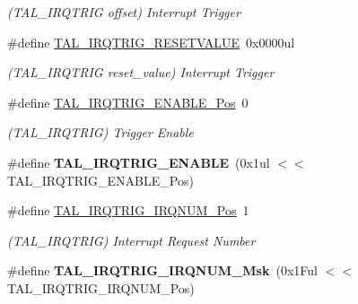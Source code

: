 \begin{DoxyCompactItemize}
\begin{DoxyCompactList}\small\item\em (T\+A\+L\+\_\+\+I\+R\+Q\+T\+R\+I\+G offset) Interrupt Trigger \end{DoxyCompactList}\item 
\hypertarget{group___s_a_m_l21___t_a_l_ga2c3b679d0a53072541842ff8c15009c8}{}\#define \hyperlink{group___s_a_m_l21___t_a_l_ga2c3b679d0a53072541842ff8c15009c8}{T\+A\+L\+\_\+\+I\+R\+Q\+T\+R\+I\+G\+\_\+\+R\+E\+S\+E\+T\+V\+A\+L\+U\+E}~0x0000ul\label{group___s_a_m_l21___t_a_l_ga2c3b679d0a53072541842ff8c15009c8}

\begin{DoxyCompactList}\small\item\em (T\+A\+L\+\_\+\+I\+R\+Q\+T\+R\+I\+G reset\+\_\+value) Interrupt Trigger \end{DoxyCompactList}\item 
\hypertarget{group___s_a_m_l21___t_a_l_ga9438bc2cfd0b5f7bd8e68c7a25ffa315}{}\#define \hyperlink{group___s_a_m_l21___t_a_l_ga9438bc2cfd0b5f7bd8e68c7a25ffa315}{T\+A\+L\+\_\+\+I\+R\+Q\+T\+R\+I\+G\+\_\+\+E\+N\+A\+B\+L\+E\+\_\+\+Pos}~0\label{group___s_a_m_l21___t_a_l_ga9438bc2cfd0b5f7bd8e68c7a25ffa315}

\begin{DoxyCompactList}\small\item\em (T\+A\+L\+\_\+\+I\+R\+Q\+T\+R\+I\+G) Trigger Enable \end{DoxyCompactList}\item 
\hypertarget{group___s_a_m_l21___t_a_l_gaf133ee92909a7e0b075973fa7b409558}{}\#define {\bfseries T\+A\+L\+\_\+\+I\+R\+Q\+T\+R\+I\+G\+\_\+\+E\+N\+A\+B\+L\+E}~(0x1ul $<$$<$ T\+A\+L\+\_\+\+I\+R\+Q\+T\+R\+I\+G\+\_\+\+E\+N\+A\+B\+L\+E\+\_\+\+Pos)\label{group___s_a_m_l21___t_a_l_gaf133ee92909a7e0b075973fa7b409558}

\item 
\hypertarget{group___s_a_m_l21___t_a_l_ga841d1e8848cc24d5f51a365853ff3072}{}\#define \hyperlink{group___s_a_m_l21___t_a_l_ga841d1e8848cc24d5f51a365853ff3072}{T\+A\+L\+\_\+\+I\+R\+Q\+T\+R\+I\+G\+\_\+\+I\+R\+Q\+N\+U\+M\+\_\+\+Pos}~1\label{group___s_a_m_l21___t_a_l_ga841d1e8848cc24d5f51a365853ff3072}

\begin{DoxyCompactList}\small\item\em (T\+A\+L\+\_\+\+I\+R\+Q\+T\+R\+I\+G) Interrupt Request Number \end{DoxyCompactList}\item 
\hypertarget{group___s_a_m_l21___t_a_l_ga7a3880da5d6889ebfb1192998ebc3b76}{}\#define {\bfseries T\+A\+L\+\_\+\+I\+R\+Q\+T\+R\+I\+G\+\_\+\+I\+R\+Q\+N\+U\+M\+\_\+\+Msk}~(0x1\+Ful $<$$<$ T\+A\+L\+\_\+\+I\+R\+Q\+T\+R\+I\+G\+\_\+\+I\+R\+Q\+N\+U\+M\+\_\+\+Pos)\label{group___s_a_m_l21___t_a_l_ga7a3880da5d6889ebfb1192998ebc3b76}


\end{DoxyCompactItemize}
